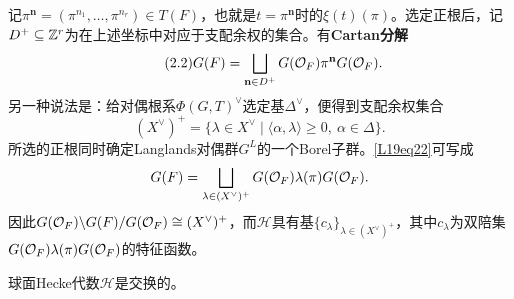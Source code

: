记$\pi^{\mathbf n}=(\pi^{n_1},\ldots,\pi^{n_r})\in T(F)$，也就是$t=\pi^{\mathbf n}$时的$\xi(t)(\pi)$。选定正根后，记$D^+\subseteq\mathbb{Z}^r$为在上述坐标中对应于支配余权的集合。有\textbf{Cartan分解}
\begin{equation}\tag{2.2}\label{L19eq22}G(F)=\bigsqcup_{\mathbf n\in D^+}G(\mathcal O_F)\pi^{\mathbf n}G(\mathcal O_F).\end{equation}
另一种说法是：给对偶根系$\Phi(G,T)^\vee$选定基$\Delta^\vee$，便得到支配余权集合
\[(X^\vee)^+=\{\lambda\in X^\vee\mid\langle\alpha,\lambda\rangle\ge0,\ \alpha\in\Delta\}.\]
所选的正根同时确定Langlands对偶群$G^L$的一个Borel子群。\eqref{L19eq22}可写成
\[G(F)=\bigsqcup_{\lambda\in(X^\vee)^+}G(\mathcal O_F)\lambda(\pi)G(\mathcal O_F).\]
因此$G(\mathcal O_F)\backslash G(F)/G(\mathcal O_F)\cong(X^\vee)^+$，而$\mathcal H$具有基$\{c_\lambda\}_{\lambda\in(X^\vee)^+}$，其中$c_\lambda$为双陪集$G(\mathcal O_F)\lambda(\pi)G(\mathcal O_F)$的特征函数。
\begin{proposition}\label{L19S2O2}球面Hecke代数$\mathcal H$是交换的。\end{proposition}
